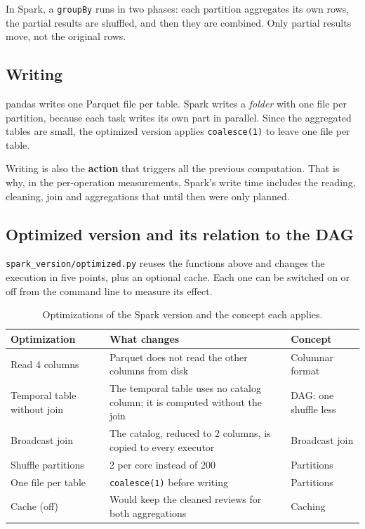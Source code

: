 \documentclass[11pt,a4paper]{article}
\begin{document}
In Spark, a \texttt{groupBy} runs in two phases: each partition aggregates its own rows, the
partial results are shuffled, and then they are combined. Only partial results move, not the
original rows.

\subsection{Writing}

pandas writes one Parquet file per table. Spark writes a \emph{folder} with one file per
partition, because each task writes its own part in parallel. Since the aggregated tables
are small, the optimized version applies \texttt{coalesce(1)} to leave one file per table.

Writing is also the \textbf{action} that triggers all the previous computation. That is why,
in the per-operation measurements, Spark's write time includes the reading, cleaning, join
and aggregations that until then were only planned.

\subsection{Optimized version and its relation to the DAG}

\texttt{spark\_version/optimized.py} reuses the functions above and changes the execution in
five points, plus an optional cache. Each one can be switched on or off from the command
line to measure its effect.

\begin{table}[H]
\centering
\small
\caption{Optimizations of the Spark version and the concept each applies.}
\label{tab:optimizations}
\begin{tabularx}{\textwidth}{lXl}
\toprule
Optimization & What changes & Concept \\
\midrule
Read 4 columns & Parquet does not read the other columns from disk & Columnar format \\
Temporal table without join & The temporal table uses no catalog column; it is computed without the join & DAG: one shuffle less \\
Broadcast join & The catalog, reduced to 2 columns, is copied to every executor & Broadcast join \\
Shuffle partitions & 2 per core instead of 200 & Partitions \\
One file per table & \texttt{coalesce(1)} before writing & Partitions \\
Cache (off) & Would keep the cleaned reviews for both aggregations & Caching \\
\bottomrule
\end{tabularx}
\end{table}
\end{document}

